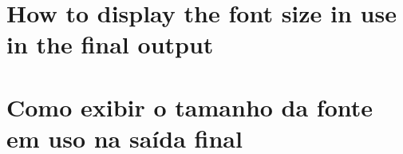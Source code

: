 


%
%

\lang
{\chapter[Sample example]{How to display the font size in use in the final output}}
{\chapter[Anexo exemplo]{Como exibir o tamanho da fonte em uso na saída final}}


